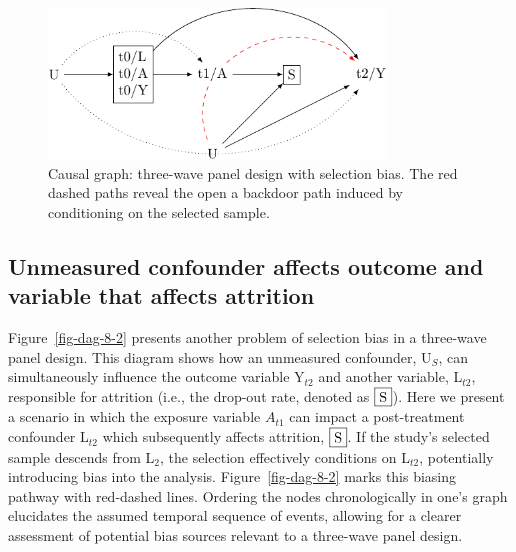 \documentclass[
  singlecolumn]{report}
\begin{document}
\begin{figure}

{\centering \includegraphics[width=0.8\textwidth,height=\textheight]{causal-dags_files/figure-pdf/fig-dag-8-1.pdf}

}

\caption{\label{fig-dag-8}Causal graph: three-wave panel design with
selection bias. The red dashed paths reveal the open a backdoor path
induced by conditioning on the selected sample.}

\end{figure}

\hypertarget{unmeasured-confounder-affects-outcome-and-variable-that-affects-attrition}{%
\subsection{Unmeasured confounder affects outcome and variable that
affects
attrition}\label{unmeasured-confounder-affects-outcome-and-variable-that-affects-attrition}}

Figure~\ref{fig-dag-8-2} presents another problem of selection bias in a
three-wave panel design. This diagram shows how an unmeasured
confounder, U\(_S\), can simultaneously influence the outcome variable
Y\(_{t2}\) and another variable, L\(_{t2}\), responsible for attrition
(i.e., the drop-out rate, denoted as \(\framebox{S}\)). Here we present
a scenario in which the exposure variable \(A_{t1}\) can impact a
post-treatment confounder L\(_{t2}\) which subsequently affects
attrition, \(\framebox{S}\). If the study's selected sample descends
from L\(_2\), the selection effectively conditions on L\(_{t2}\),
potentially introducing bias into the analysis. Figure~\ref{fig-dag-8-2}
marks this biasing pathway with red-dashed lines. Ordering the nodes
chronologically in one's graph elucidates the assumed temporal sequence
of events, allowing for a clearer assessment of potential bias sources
relevant to a three-wave panel design.
\end{document}
